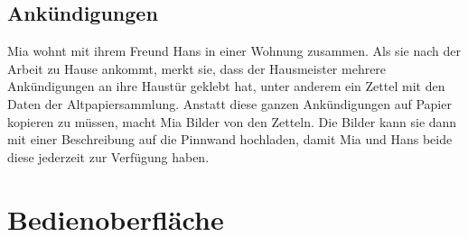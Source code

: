 \documentclass[a4paper]{scrreprt}
\begin{document}
        \subsection{Ankündigungen}
        Mia wohnt mit ihrem Freund Hans in einer Wohnung zusammen. Als sie nach der Arbeit zu Hause ankommt, merkt sie, dass der Hausmeister mehrere Ankündigungen an ihre Haustür geklebt hat, unter anderem ein Zettel mit den Daten der Altpapiersammlung.
        Anstatt diese ganzen Ankündigungen auf Papier kopieren zu müssen, macht Mia Bilder von den Zetteln. Die Bilder kann sie dann mit einer Beschreibung auf die Pinnwand hochladen, damit Mia und Hans beide diese jederzeit zur Verfügung haben.
        

        \newpage
			
        	
        	\newpage
        \section{Bedienoberfläche}
        
\end{document}
